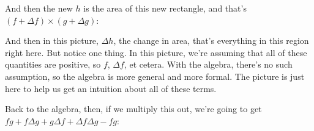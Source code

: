 \documentclass[pdftex, brazil, 12pt, twoside]{article}
\begin{document}
And then the new $h$ is the area of this new rectangle,
and that's $(f + \Delta f) \times (g + \Delta g)$:

\begin{figure}[H]
  \begin{center}
  \end{center}
\end{figure}

And then in this picture, $\Delta h$, the change in area,
that's everything in this region right here.
But notice one thing.
In this picture, we're assuming that all of these quantities
are positive, so $f$, $\Delta f$, et cetera.
With the algebra, there's no such assumption,
so the algebra is more general and more formal.
The picture is just here to help us get an intuition
about all of these terms.

Back to the algebra, then, if we multiply this out,
we're going to get $fg + f\Delta g + g\Delta f + \Delta f \Delta g - fg$:

\begin{figure}[H]
  \begin{center}
  \end{center}
\end{figure}
\end{document}
